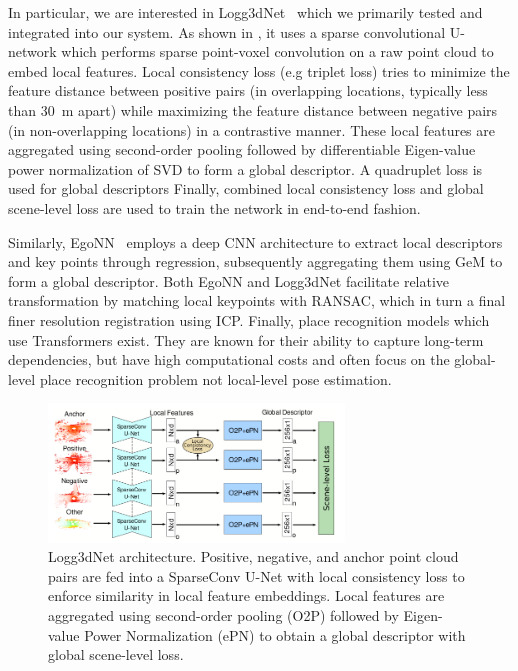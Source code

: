 In particular, we are interested in Logg3dNet~\cite{vidanapathirana2022icra} which we primarily tested and integrated into our system. As shown in , it uses a sparse convolutional U-network which performs sparse point-voxel convolution on a raw point cloud to embed local features. Local consistency loss (e.g triplet loss) tries to minimize the feature distance between positive pairs (in overlapping locations, typically less than \SI{30}{\meter} apart) while maximizing the feature distance between negative pairs (in non-overlapping locations) in a contrastive manner. These local features are aggregated using second-order pooling followed by differentiable Eigen-value power normalization of SVD to form a global descriptor. A quadruplet loss is used for global descriptors Finally, combined local consistency loss and global scene-level loss are used to train the network in end-to-end fashion. 

Similarly, EgoNN~\cite{komorowski2022ral} employs a deep CNN architecture to extract local descriptors and key points through regression, subsequently aggregating them using GeM to form a global descriptor.
Both EgoNN and Logg3dNet facilitate relative transformation by matching local keypoints with RANSAC, which in turn a final finer resolution registration using ICP. Finally, place recognition models which use Transformers \cite{zhang2019cvpr, xia2021cvpr, zhou2021icra} exist. They are known for their ability to capture long-term dependencies, but have high computational costs and often focus on the global-level place recognition problem not local-level pose estimation. \vspace{8pt}


\begin{figure}
    \centering
    \includegraphics[width=0.7\textwidth]{pics/related_work_logg3dnet_model.png}
    \caption{Logg3dNet architecture. Positive, negative, and anchor point cloud pairs are fed into a SparseConv U-Net with local consistency loss to enforce similarity in local feature embeddings. Local features are aggregated using second-order pooling (O2P) followed by Eigen-value Power Normalization (ePN) to obtain a global descriptor with global scene-level loss. }
    \label{fig:logg3dnet}
\end{figure}

